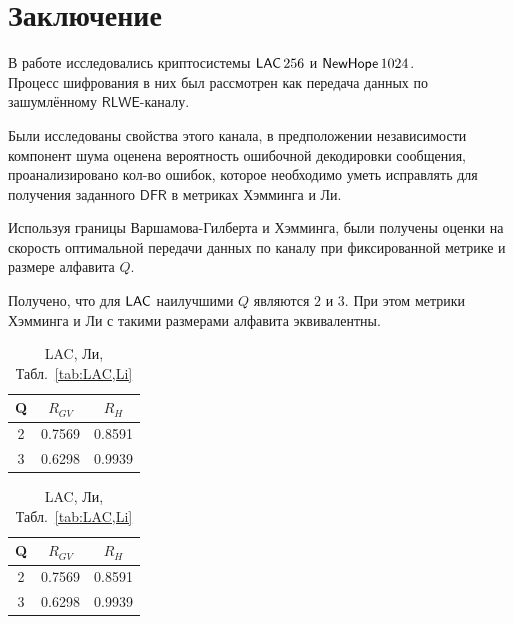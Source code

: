 \section{Заключение}
\label{sec:Chapter7} 


В работе исследовались криптосистемы $\mathsf{LAC}\,256$ и $\mathsf{NewHope}\,1024$.\\ Процесс шифрования в них был рассмотрен как передача данных по зашумлённому $\mathsf{RLWE}$-каналу.

Были исследованы свойства этого канала, в предположении независимости компонент шума оценена вероятность ошибочной декодировки сообщения, проанализировано кол-во ошибок, которое необходимо уметь исправлять для получения заданного $\mathsf{DFR}$ в метриках Хэмминга и Ли.

Используя границы Варшамова-Гилберта и Хэмминга, были получены оценки на скорость оптимальной передачи данных по каналу при фиксированной метрике и размере алфавита $Q$.

Получено, что для $\mathsf{LAC}$ наилучшими $Q$ являются $2$ и $3$. При этом метрики Хэмминга и Ли с такими размерами алфавита эквивалентны.
\begin{table}[h]
	\centering
	\begin{minipage}{0.48\textwidth}
		\caption{LAC, Хэмминг, Табл.~\ref{tab:LAC,Ham}}
		\centering
		\begin{tabular}{|c|c|c|}
			\hline Q & $R_{GV}$ & $R_H$ \\ \hline
			2 & 0.7569 & 0.8591 \\ \hline
			3 & 0.6298 & 0.9939 \\ \hline
		\end{tabular}
	\end{minipage}
	\hfill
	\begin{minipage}{0.48\textwidth}
		\caption{LAC, Ли, Табл.~\ref{tab:LAC,Li}}
		\centering
		\begin{tabular}{|c|c|c|}
			\hline Q & $R_{GV}$ & $R_H$ \\ \hline
			2 & 0.7569 & 0.8591 \\ \hline
			3 & 0.6298 & 0.9939 \\ \hline
		\end{tabular}
	\end{minipage}
\end{table}

